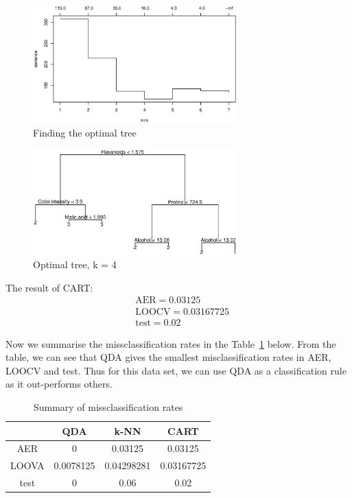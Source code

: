 \documentclass{article}
\begin{document}
\begin{enumerate}[leftmargin = 0 em, label = \arabic*., font = \bfseries]
\begin{enumerate}
\begin{figure}[!htb]
	\centering
	\includegraphics[width = 0.7\textwidth]{findtree.eps}
	\caption{Finding the optimal tree}
	\label{findtree}
\end{figure}

\begin{figure}[!htb]
	\centering
	\includegraphics[width = 0.7\textwidth]{opttree.eps}
	\caption{Optimal tree, k = 4}
	\label{opttree}
\end{figure}

The result of CART:
\begin{align*}
&\mathrm{AER} = 0.03125\\
&\mathrm{LOOCV} = 0.03167725\\
& \mathrm{test} = 0.02
\end{align*}
\end{enumerate}

Now we summarise the missclassification rates in the Table~\ref{miscr} below. From the table, we can see that QDA gives the smallest misclassification rates in AER, LOOCV and test. Thus for this data set, we can use QDA as a classification rule as it out-performs others.

\begin{table}
\caption{Summary of missclassification rates}
\label{miscr}
\begin{center}
\begin{tabular}{cccc}
\toprule
  & QDA & k-NN & CART \\
  \midrule
AER & 0 &  0.03125 & 0.03125\\
LOOVA &  0.0078125 & 0.04298281 & 0.03167725\\
test & 0 & 0.06 & 0.02\\
\bottomrule
\end{tabular}\end{center}
\end{table}


\end{enumerate}
\end{document}
